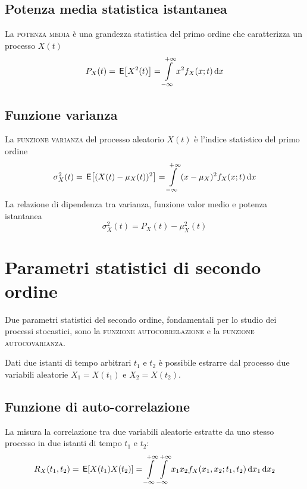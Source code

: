 \subsection{Potenza media statistica istantanea}
La \textsc{potenza media} è una grandezza statistica del primo ordine che caratterizza un processo $X(t)$
\begin{equation}
P_X(t)=\,{\operatorname{\mathsf{E}}}\!\left[{X^2(t)}\right]=\int\limits_{-\infty}^{+\infty}{x^2 f_X(x;t)}{\,\mathop{}\!\mathrm{d}{x}}
\end{equation}

\subsection{Funzione varianza}
La \textsc{funzione varianza} del processo aleatorio $X(t)$ è l'indice statistico del primo ordine 
\begin{equation}
\sigma^2_X(t)=\,{\operatorname{\mathsf{E}}}\!\left[{(X(t)-\mu_X(t))^2}\right]=\int\limits_{-\infty}^{+\infty}{(x-\mu_X)^2 f_X(x;t)}{\,\mathop{}\!\mathrm{d}{x}}
\end{equation}
La relazione di dipendenza tra varianza, funzione valor medio e potenza istantanea
\begin{equation}
\sigma^2_X(t)=P_X(t)-\mu^2_X(t)
\end{equation}

\section{Parametri statistici di secondo ordine}
Due parametri statistici del secondo ordine, fondamentali per lo studio dei processi stocastici, sono la \textsc{funzione autocorrelazione} e la \textsc{funzione autocovarianza}.

Dati due istanti di tempo arbitrari $t_1$ e $t_2$ è possibile estrarre dal processo due variabili aleatorie $X_1=X(t_1)$ e $X_2=X(t_2)$.

\subsection{Funzione di auto-correlazione}
La  misura la correlazione tra due variabili aleatorie estratte da uno stesso processo in due istanti di tempo $t_1$ e $t_2$:
\begin{equation}\label{eq:proc_autocorrelazione}
R_X(t_1,t_2)=\,{\operatorname{\mathsf{E}}}\!\left[{X(t_1)X(t_2)}\right]=\int\limits_{-\infty}^{+\infty}{\int\limits_{-\infty}^{+\infty}{x_1 x_2 f_X(x_1,x_2;t_1,t_2)}{\,\mathop{}\!\mathrm{d}{x_1}}}{\,\mathop{}\!\mathrm{d}{x_2}}
\end{equation}


